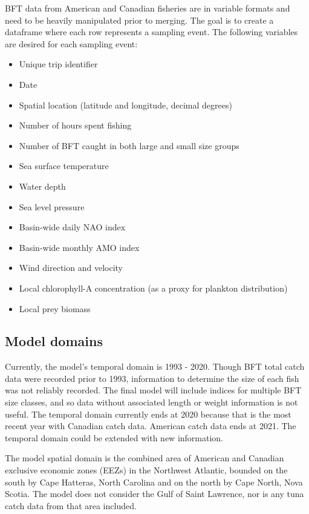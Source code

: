 \documentclass[
]{article}
\providecommand{\tightlist}{%
  \setlength{\itemsep}{0pt}\setlength{\parskip}{0pt}}
\begin{document}
BFT data from American and Canadian fisheries are in variable formats and need to be heavily manipulated prior to merging. The goal is to create a dataframe where each row represents a sampling event. The following variables are desired for each sampling event:

\begin{itemize}
\tightlist
\item
  Unique trip identifier
\item
  Date
\item
  Spatial location (latitude and longitude, decimal degrees)
\item
  Number of hours spent fishing
\item
  Number of BFT caught in both large and small size groups
\item
  Sea surface temperature
\item
  Water depth
\item
  Sea level pressure
\item
  Basin-wide daily NAO index
\item
  Basin-wide monthly AMO index
\item
  Wind direction and velocity
\item
  Local chlorophyll-A concentration (as a proxy for plankton distribution)
\item
  Local prey biomass
\end{itemize}

\hypertarget{model-domains}{%
\subsection{Model domains}\label{model-domains}}

Currently, the model's temporal domain is 1993 - 2020. Though BFT total catch data were recorded prior to 1993, information to determine the size of each fish was not reliably recorded. The final model will include indices for multiple BFT size classes, and so data without associated length or weight information is not useful. The temporal domain currently ends at 2020 because that is the most recent year with Canadian catch data. American catch data ends at 2021. The temporal domain could be extended with new information.

The model spatial domain is the combined area of American and Canadian exclusive economic zones (EEZs) in the Northwest Atlantic, bounded on the south by Cape Hatteras, North Carolina and on the north by Cape North, Nova Scotia. The model does not consider the Gulf of Saint Lawrence, nor is any tuna catch data from that area included.
\end{document}
